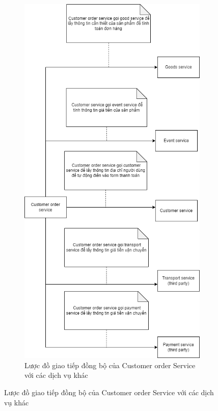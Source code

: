 \begin{figure}[!htp]
\begin{figure}[!htp]
	\centering
	\includegraphics[width=10cm]{img/Architecture/service/customer-order-call.png}
	\newline
	\caption{Lược đồ giao tiếp đồng bộ của Customer order Service với các dịch vụ khác}
\end{figure}


\end{figure}
